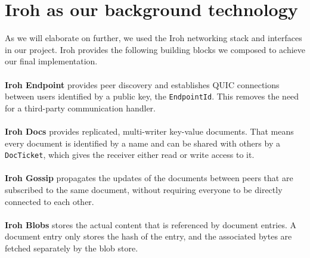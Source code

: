 \documentclass{article} %
\begin{document}
\section{Iroh as our background technology}
As we will elaborate on further, we used the Iroh networking stack and interfaces \cite{iroh} in our project.
Iroh provides the following building blocks we composed to achieve our final implementation.
\\ \\
\textbf{Iroh Endpoint} provides peer discovery and establishes QUIC connections between users identified by a public key, the \texttt{EndpointId}. This removes the need for a third-party communication handler.
\\ \\
\textbf{Iroh Docs} provides replicated, multi-writer
    key-value documents. That means every document is identified by a name
    and can be shared with others by a \texttt{DocTicket},
    which gives the receiver either read or write access to it.
\\ \\
\textbf{Iroh Gossip} propagates the updates of the documents between
    peers that are subscribed to the same document, without requiring
    everyone to be directly connected to each other.
\\ \\
\textbf{Iroh Blobs} stores the actual content that is referenced by
    document entries. A document entry only stores the hash of the entry, and
    the associated bytes are fetched separately by the blob store.
\\ \\
\end{document}
